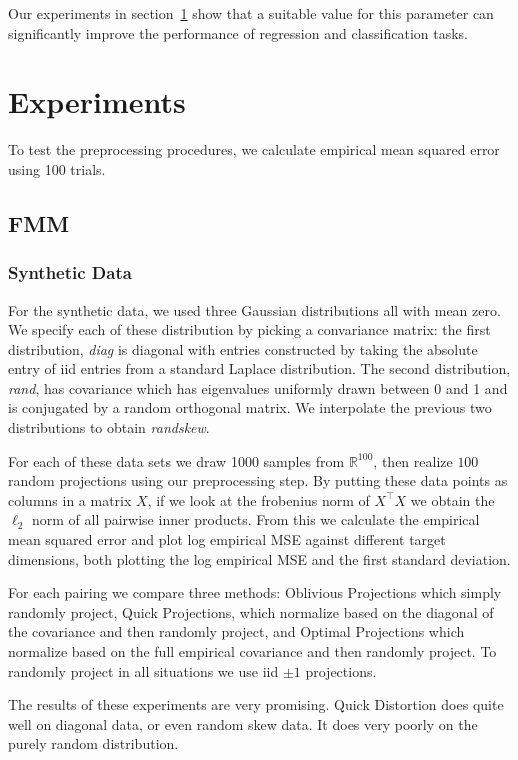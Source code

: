 \documentclass{article}
\theoremstyle{definition}
\theoremstyle{plain}
\begin{document}
Our experiments in section~\ref{sec:experiments} show that a suitable value for this parameter can significantly improve the performance of regression and classification tasks.


\section{Experiments}\label{sec:experiments}
To test the preprocessing procedures, we calculate empirical mean squared error using 100 trials. 

\subsection*{FMM}
\subsubsection*{Synthetic Data}
For the synthetic data, we used three Gaussian distributions all with mean zero. We specify each of these distribution by picking a convariance matrix: the first distribution, \emph{diag} is diagonal with entries constructed by taking the absolute entry of iid entries from a standard Laplace distribution. The second distribution, \emph{rand},  has covariance which has eigenvalues uniformly drawn between 0 and 1 and is conjugated by a random orthogonal matrix. We interpolate the previous two distributions to obtain \emph{randskew}. 

For each of these data sets we draw 1000 samples from $\mathbb{R}^{100}$, then realize $100$ random projections using our preprocessing step. By putting these data points as columns in a matrix $X$, if we look at the frobenius norm of $X^\top X$ we obtain the $\ell_2$ norm of all pairwise inner products. From this we calculate the empirical mean squared error and plot log empirical MSE against different target dimensions, both plotting the log empirical MSE and the first standard deviation.

For each pairing we compare three methods: Oblivious Projections which simply randomly project, Quick Projections, which normalize based on the diagonal of the covariance and then randomly project, and Optimal Projections which normalize based on the full empirical covariance and then randomly project. To randomly project in all situations we use iid $\pm 1$ projections.

The results of these experiments are very promising. Quick Distortion does quite well on diagonal data, or even random skew data. It does very poorly on the purely random distribution.
\end{document}
